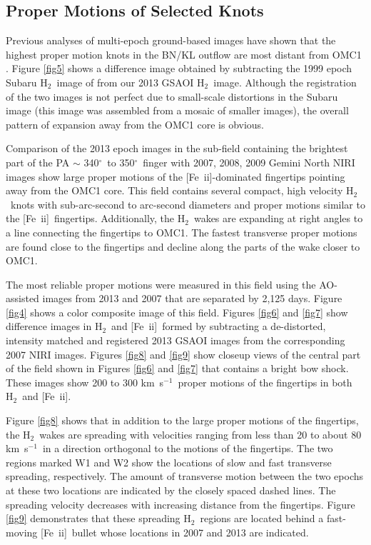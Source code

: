 \documentclass{aa}
\newcommand\arcdeg{\mbox{$^\circ$}\xspace}  %
\newcommand{\kms}{km~s{$^{-1}$}}
\newcommand{\Feii}{[Fe~{\sc ii}]}
\newcommand{\hh}{\ensuremath{\textrm{H}_{2}}}			%
\begin{document}
\subsection{Proper Motions of Selected Knots}

Previous analyses of  multi-epoch ground-based images have shown that the highest 
proper  motion knots in  the BN/KL outflow are most distant from OMC1 \citep{JonesWalker1985,LeeBurton2000,Bally2011}.  
Figure \ref{fig5} shows a difference image obtained  by subtracting the 1999 epoch 
Subaru \hh\  image of \citet{Kaifu2000} from our 2013  GSAOI \hh\   image.    Although the
registration of the two images is not perfect due to small-scale distortions in the Subaru image
(this image was assembled from a mosaic of smaller images), the overall pattern
of expansion away from the OMC1 core is obvious.

Comparison of the 2013 epoch images in the sub-field containing the brightest part of the
PA $\sim$ 340\arcdeg\ to 350\arcdeg\  finger with 2007, 2008, 2009 Gemini North 
NIRI images show large proper motions of  the \Feii -dominated fingertips pointing
away from the OMC1 core.   This field contains  several compact, high velocity  \hh\  
knots with sub-arc-second to arc-second diameters and proper motions similar to
the \Feii\  fingertips.      Additionally, the \hh\ wakes are expanding at right angles
to a line connecting the fingertips to OMC1.    The fastest transverse proper motions 
are found close to the fingertips and decline along the parts of the wake closer to OMC1.

The most reliable proper motions were measured in this field using
the AO-assisted images from  2013 and 2007 that are separated by 2,125 days.  
Figure \ref{fig4} shows a color composite image of this field.  
Figures \ref{fig6} and  \ref{fig7}  show  difference images in   \hh\  and \Feii\  
formed by subtracting a de-distorted, intensity matched and registered
2013 GSAOI images from the corresponding 2007 NIRI images.  
Figures \ref{fig8} and \ref{fig9}  show closeup views of the central part of the
field shown in  Figures \ref{fig6} and \ref{fig7} that contains a bright bow shock. 
These  images show 200 to 300 \kms\ proper motions of the fingertips
in both \hh\ and \Feii .  
 
Figure \ref{fig8}   shows  that in addition to the large proper motions of the 
fingertips,  the \hh\ wakes are spreading with velocities 
ranging from less than 20 to about 80 \kms\  in a direction orthogonal to the motions 
of the  fingertips.     The two regions marked W1 and W2 show
the locations of slow and fast transverse spreading, respectively. 
The amount of transverse motion between the two epochs at these two 
locations are indicated by the  closely spaced dashed lines. 
The spreading velocity decreases with increasing distance from the fingertips. 
Figure \ref{fig9}  demonstrates that these spreading \hh\ regions are located 
behind a  fast-moving \Feii\ bullet whose locations in 2007 and 2013 are indicated.
\end{document}
